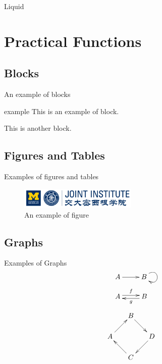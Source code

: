 \documentclass[12pt,compress]{beamer}
\begin{document}
\begin{frame}{Liquid}

\end{frame}


\section{Practical Functions}

\subsection{Blocks}
\begin{frame}{An example of blocks}
	\begin{block}{example}
		This is an example of block.
	\end{block}
	\begin{block}{}
		This is another block.
	\end{block}
\end{frame}

\subsection{Figures and Tables}
\begin{frame}{Examples of figures and tables}
	\begin{figure}
		\centering
		\includegraphics[width=0.5\textwidth]{umji.png}
		\caption{An example of figure}
		\label{fig:demofig-1}
	\end{figure}
\end{frame}

\subsection{Graphs}
\begin{frame}{Examples of Graphs}
	\[ \xymatrix{
			A \ar[r] & B \ar@(ur,dr)
		} \]
	\[ \xymatrix{
			A \ar@<.5ex>[r]^{f} & \ar@<.5ex>[l]^{g} B
		} \]
	\[ \xymatrix@ru{
			A \ar[r] & B \ar[d] \\
			C \ar[u] & D \ar[l]
		} \]

\end{frame}

\end{document}
